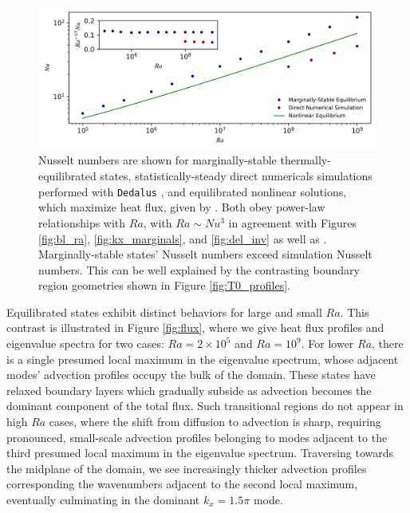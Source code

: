 \documentclass[reprint,amsmath,amssymb,aps]{revtex4-1}
\begin{document}
\begin{figure}
    \label{fig:flux}
    \vspace{0.4in}
    \includegraphics[width=7.1in]{nu_ra.PNG}
    \caption{Nusselt numbers are shown for marginally-stable thermally-equilibrated states, statistically-steady direct numericals simulations performed with \texttt{Dedalus} \cite{Anders_cd}, and equilibrated nonlinear solutions, which maximize heat flux, given by \cite{Waleffe}. Both obey power-law relationships with $Ra$, with $Ra \sim Nu^3$ in agreement with Figures \ref{fig:bl_ra}, \ref{fig:kx_marginals}, and \ref{fig:del_inv} as well as \cite{Malkus}. Marginally-stable states' Nusselt numbers exceed simulation Nusselt numbers. This can be well explained by the contrasting boundary region geometries shown in Figure \ref{fig:T0_profiles}.}%
    \label{fig:nu_vs_ra}%
\end{figure}

Equilibrated states exhibit distinct behaviors for large and small $Ra$. This contrast is illustrated in Figure \ref{fig:flux}, where we give heat flux profiles and eigenvalue spectra for two cases: $Ra = 2 \times 10^5$ and $Ra = 10^9$. For lower $Ra$, there is a single presumed local maximum in the eigenvalue spectrum, whose adjacent modes' advection profiles occupy the bulk of the domain. These states have relaxed boundary layers which gradually subside as advection becomes the dominant component of the total flux. Such transitional regions do not appear in high $Ra$ cases, where the shift from diffusion to advection is sharp, requiring pronounced, small-scale advection profiles belonging to modes adjacent to the third presumed local maximum in the eigenvalue spectrum. Traversing towards the midplane of the domain, we see increasingly thicker advection profiles corresponding the wavenumbers adjacent to the second local maximum, eventually culminating in the dominant $k_x = 1.5\pi$ mode.
\end{document}
